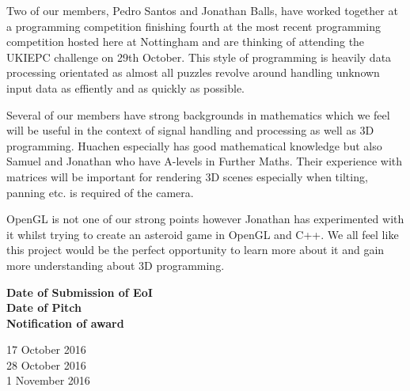 \documentclass[11pt, oneside]{article}
\begin{document}
Two of our members, Pedro Santos and Jonathan Balls, have worked together at a programming competition finishing fourth at the most recent programming competition hosted here at Nottingham and are thinking of attending the UKIEPC challenge on 29th October. This style of programming is heavily data processing orientated as almost all puzzles revolve around handling unknown input data as effiently and as quickly as possible.

Several of our members have strong backgrounds in mathematics which we feel will be useful in the context of signal handling and processing as well as 3D programming. Huachen especially has good mathematical knowledge but also Samuel and Jonathan who have A-levels in Further Maths. Their experience with matrices will be important for rendering 3D scenes especially when tilting, panning etc. is required of the camera.

OpenGL is not one of our strong points however Jonathan has experimented with it whilst trying to create an asteroid game in OpenGL and C++. We all feel like this project would be the perfect opportunity to learn more about it and gain more understanding about 3D programming.

\begin{minipage}[t]{0.5\textwidth}
    \textbf{Date of Submission of EoI}\\
    \textbf{Date of Pitch}\\
    \textbf{Notification of award}\\
    
\end{minipage}
\begin{minipage}[t]{0.5\textwidth}
    17 October 2016\\
    28 October 2016\\
    1 November 2016\\
\end{minipage}
\end{document}

